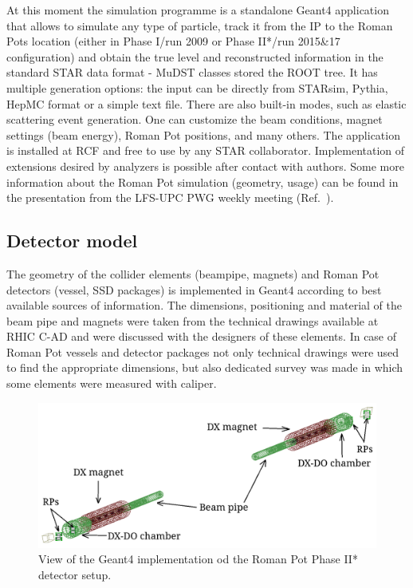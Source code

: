 At this moment the simulation programme is a standalone Geant4 application that allows to simulate any type of particle, track it from the IP to the Roman Pots location (either in Phase I/run 2009 or Phase II*/run 2015\&17 configuration) and obtain the true level and reconstructed information in the standard STAR data format - MuDST classes stored the ROOT tree. It has multiple generation options: the input can be directly from STARsim, Pythia, HepMC format or a simple text file. There are also built-in modes, such as elastic scattering event generation. One can customize the beam conditions, magnet settings (beam energy), Roman Pot positions, and many others. The application is installed at RCF and free to use by any STAR collaborator. Implementation of extensions desired by analyzers is possible after contact with authors. Some more information about the Roman Pot simulation (geometry, usage) can be found in the presentation from the LFS-UPC PWG weekly meeting (Ref.~\cite{Geant4Presentation}).

\subsection{Detector model}

The geometry of the collider elements (beampipe, magnets) and Roman Pot detectors (vessel, SSD packages) is  implemented in Geant4 according to best available sources of information. The dimensions, positioning and material of the beam pipe and magnets were taken from the technical drawings available at RHIC C-AD and were discussed with the designers of these elements. In case of Roman Pot vessels and detector packages not only technical drawings were used to find the appropriate dimensions, but also dedicated survey was made in which some elements were measured with caliper.

\begin{figure}[h]%
	\vspace{-5pt}\centering\includegraphics[width=\linewidth]{graphics/rpSim/geant4plot.png}%
	\caption{View of the Geant4 implementation od the Roman Pot Phase II* detector setup.}\label{fig:geant4plot}%
\end{figure}%

